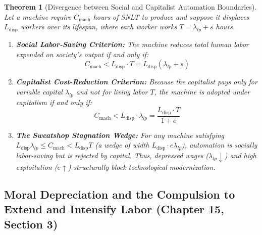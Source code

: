 \documentclass[11pt,a4paper]{article}
\newtheorem{theorem}{Theorem}[section]
\begin{document}
\begin{theorem}[Divergence between Social and Capitalist Automation Boundaries]
Let a machine require $C_{\text{mach}}$ hours of SNLT to produce and suppose it displaces $L_{\text{disp}}$ workers over its lifespan, where each worker works $T = \lambda_{lp} + s$ hours.
\begin{enumerate}[label=(\roman*)]
    \item \textbf{Social Labor-Saving Criterion:} The machine reduces total human labor expended on society's output if and only if:
    \begin{equation}
        C_{\text{mach}} < L_{\text{disp}} \cdot T = L_{\text{disp}} \left(\lambda_{lp} + s\right)
    \end{equation}
    \item \textbf{Capitalist Cost-Reduction Criterion:} Because the capitalist pays only for variable capital $\lambda_{lp}$ and not for living labor $T$, the machine is adopted under capitalism if and only if:
    \begin{equation}
        C_{\text{mach}} < L_{\text{disp}} \cdot \lambda_{lp} = \frac{L_{\text{disp}} \cdot T}{1 + e}
    \end{equation}
    \item \textbf{The Sweatshop Stagnation Wedge:} For any machine satisfying $L_{\text{disp}} \lambda_{lp} \le C_{\text{mach}} < L_{\text{disp}} T$ (a wedge of width $L_{\text{disp}} \cdot e \lambda_{lp}$), automation is socially labor-saving but is rejected by capital. Thus, depressed wages ($\lambda_{lp} \downarrow$) and high exploitation ($e \uparrow$) structurally block technological modernization.
\end{enumerate}
\end{theorem}

\subsection{Moral Depreciation and the Compulsion to Extend and Intensify Labor (Chapter 15, Section 3)}
\end{document}
